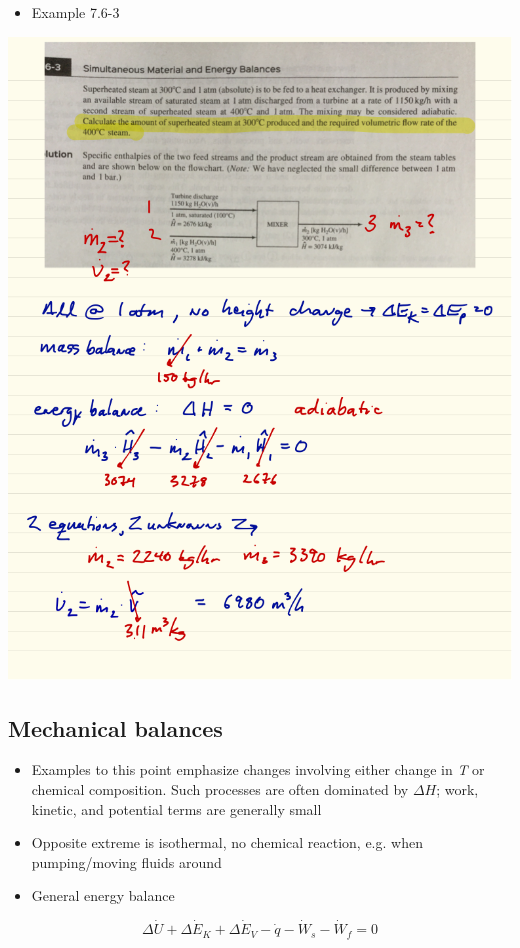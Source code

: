 \documentclass[11pt]{article}
\begin{document}
\begin{itemize}
\item Example 7.6-3
\end{itemize}
\includegraphics[width=.9\linewidth]{./figs/Example763.png}

\subsection{Mechanical balances}
\label{sec-9-6}
\begin{itemize}
\item Examples to this point emphasize changes involving either change in \emph{T} or chemical composition.  Such processes are often dominated by \(\Delta H\); work, kinetic, and potential terms are generally small
\item Opposite extreme is isothermal, no chemical reaction, e.g. when pumping/moving fluids around

\item General energy balance
\end{itemize}

\[ \Delta\dot{U} + \Delta\dot{E}_{K} + \Delta \dot{E}_{V} - \dot{q} - \dot{W}_{s} -\dot{W}_{f} = 0 \]
\end{document}
